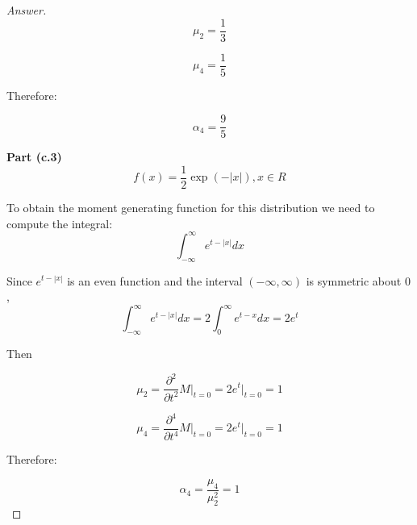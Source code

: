 \documentclass{article}
\theoremstyle{definition}
\begin{document}
\begin{proof}[Answer]
$$\mu_2 = \frac{1}{3}$$

$$\mu_4 = \frac{1}{5}$$

Therefore:

$$\boxed{\alpha_4 = \frac{9}{5}}$$

\textbf{Part (c.3)}
$$f(x)=\frac{1}{2} \exp (-|x|), x \in R$$

To obtain the moment generating function for this distribution we need to compute the  integral:
$$\int_{-\infty}^{\infty} e^{t-|x|} d x$$

Since  $e^{t-| x |}$  is an even function and the interval $(-\infty, \infty)$  is symmetric about  $0$, $$\int_{-\infty}^{\infty} e^{t-|x|} d x=2 \int_{0}^{\infty} e^{t-x} d x = 2e^t$$

Then 

$$\mu_2 = \frac{\partial^2 }{\partial t^2}M\big |_{t=0}= 2e^t  \big |_{t=0} = 1$$

$$\mu_4 = \frac{\partial^4 }{\partial t^4}M\big |_{t=0}= 2e^t \big |_{t=0} = 1$$


Therefore:

$$\boxed{\alpha_4 = \frac{\mu_4}{\mu_2^2}=1}$$

\end{proof}


\end{document}
